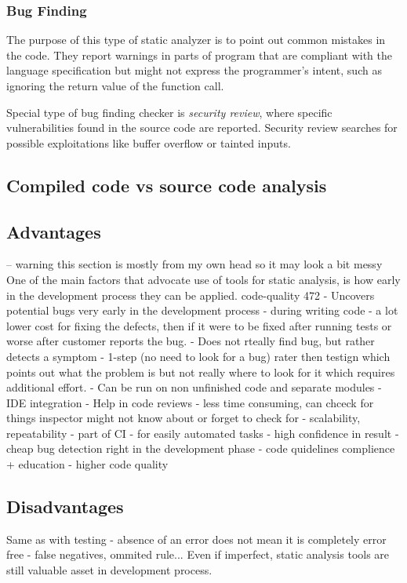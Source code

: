 \documentclass[
  digital, %
  table,   %
  lof,     %
  lot,     %
  oneside,
]{fithesis3}
\begin{document}
\subsubsection{Bug Finding}
The  purpose of this type of static analyzer is to point out common mistakes in the code. They report warnings in parts of program that are compliant with the language specification but might not express the programmer's intent, such as ignoring the return value of the function call.

Special type of bug finding checker is \textit{security review}, where specific vulnerabilities found in the source code are reported. Security review searches for possible exploitations like buffer overflow or tainted inputs.
  
\subsection{Compiled code vs source code analysis}

\subsection{Advantages}
  -- warning this section is mostly from my own head so it may look a bit messy
One of the main factors that advocate use of tools for static analysis, is how early in the development process they can be applied.
code-quality 472
- Uncovers potential bugs very early in the development process - during writing code - a lot lower cost for fixing the defects, then if it were to be fixed after running tests or worse after customer reports the bug.
- Does not rteally find bug, but rather detects a symptom - 1-step (no need to look for a bug) rater then testign which points out what the problem is but not really where to look for it which requires additional effort.
- Can be run on non unfinished code and separate modules - IDE integration
- Help in code reviews - less time consuming, can chceck for things inspector might not know about or forget to check for
- scalability, repeatability - part of CI
- for easily automated tasks - high confidence in result
- cheap bug detection right in the development phase
- code quidelines complience + education
- higher code quality
  
\subsection{Disadvantages}

Same as with testing - absence of an error does not mean it is completely error free - false negatives, ommited rule...
Even if imperfect, static analysis tools are still valuable asset in development process.
\end{document}
